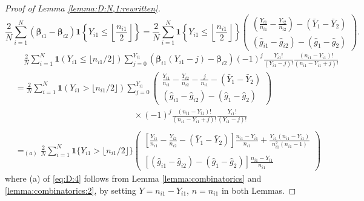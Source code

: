 \documentclass[10pt,a4paper]{amsart}
\begin{document}
\begin{proof}[Proof of Lemma \ref{lemma:D:N,1:rewritten}]
\begin{equation}\label{eq:D:3}
    \frac{2}{N}\sum_{i=1}^N(\boldsymbol{\beta}_{i1}-\boldsymbol{\beta}_{i2})\mathbf{1}\left\{Y_{i1}\leq \left\lfloor \frac{n_{i1}}{2}\right\rfloor\right\}=\frac{2}{N}\sum_{i=1}^N\mathbf{1}\left\{Y_{i1}\leq\left\lfloor \frac{n_{i1}}{2}\right\rfloor\right\}\begin{pmatrix}
\displaystyle\left(\frac{Y_{i1}}{n_{i1}}-\frac{Y_{i2}}{n_{i2}}\right)-(\bar{Y}_1-\bar{Y}_2)\\
\displaystyle(\hat{g}_{i1}-\hat{g}_{i2})-(\hat{g}_1-\hat{g}_2)
\end{pmatrix}.
\end{equation}
\begin{equation}\label{eq:D:4}
\begin{array}{rl}
&\quad\displaystyle\frac{2}{N}\sum_{i=1}^N\mathbf{1}(Y_{i1}\leq \lfloor n_{i1}/2\rfloor)\sum_{j=0}^{Y_{i1}}(\boldsymbol{\beta}_{i1}(Y_{i1}-j)-\boldsymbol{\beta}_{i2})(-1)^{j}\frac{Y_{i1}!}{(Y_{i1}-j)!}\frac{(n_{i1}-Y_{i1})!}{(n_{i1}-Y_{i1}+j)!}\\
&\displaystyle=\frac{2}{N}\sum_{i=1}^N\mathbf{1}(Y_{i1} > \lfloor n_{i1}/2\rfloor)\sum_{j=0}^{Y_{i1}}\begin{pmatrix}
\displaystyle\frac{Y_{i1}}{n_{i1}}-\frac{Y_{i2}}{n_{i2}}-\frac{j}{n_{i1}}-(\bar{Y}_1-\bar{Y}_2)\\
\displaystyle(\hat{g}_{i1}-\hat{g}_{i2})-(\hat{g}_1-\hat{g}_2)
\end{pmatrix}\\
&\quad\quad\quad\quad\quad\quad\quad\quad\quad\quad\quad\quad\quad\quad\displaystyle\times(-1)^{j}\frac{(n_{i1}-Y_{i1})!}{(n_{i1}-Y_{i1}+j)!}\frac{Y_{i1}!}{(Y_{i1}-j)!}\\
\\
&\displaystyle=_{(a)}\frac{2}{N}\sum_{i=1}^N\mathbf{1}\{Y_{i1} > \lfloor n_{i1}/2\rfloor\}\begin{pmatrix}
\displaystyle\left[\frac{Y_{i1}}{n_{i1}}-\frac{Y_{i2}}{n_{i2}}-(\bar{Y}_1-\bar{Y}_2)\right]\frac{n_{i1}-Y_{i1}}{n_{i1}}+\frac{Y_{i1}(n_{i1}-Y_{i1})}{n_{i1}^2(n_{i1}-1)}\\
\\
\displaystyle\left[(\hat{g}_{i1}-\hat{g}_{i2})-(\hat{g}_1-\hat{g}_2)\right]\frac{n_{i1}-Y_{i1}}{n_{i1}}
\end{pmatrix}
\end{array}
\end{equation}
where (a) of \eqref{eq:D:4} follows from Lemma \ref{lemma:combinatorics} and \ref{lemma:combinatorics:2}, by setting $Y=n_{i1}-Y_{i1}$, $n=n_{i1}$ in both Lemmas.

\end{proof}
\end{document}
